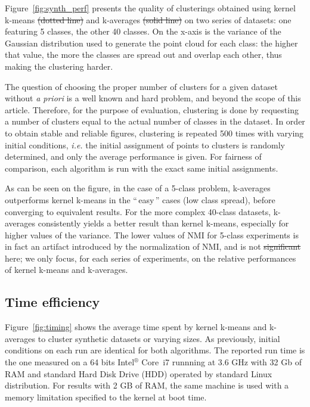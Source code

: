 \documentclass[natbib,smallextended]{svjour3}
\newcommand{\gl}[1]{``\,#1\,''} %
\providecommand{\DIFaddtex}[1]{{\protect\color{blue}\uwave{#1}}} %
\providecommand{\DIFdeltex}[1]{{\protect\color{red}\sout{#1}}}                      %
\providecommand{\DIFaddbegin}{} %
\providecommand{\DIFaddend}{} %
\providecommand{\DIFdelbegin}{} %
\providecommand{\DIFdelend}{} %
\providecommand{\DIFadd}[1]{\texorpdfstring{\DIFaddtex{#1}}{#1}} %
\providecommand{\DIFdel}[1]{\texorpdfstring{\DIFdeltex{#1}}{}} %
\begin{document}
Figure~\ref{fig:synth_perf} presents the quality of clusterings obtained using kernel k-means \DIFdelbegin \DIFdel{(dotted line) }\DIFdelend and k-averages \DIFdelbegin \DIFdel{(solid line) }\DIFdelend on two series of datasets: one featuring 5 classes, the other 40 classes. On the x-axis is the variance of the Gaussian distribution used to generate the point cloud for each class: the higher that value, the more the classes are spread out and overlap each other, thus making the clustering harder.

The question of choosing the proper number of clusters for a given dataset without \textit{a priori} is a well known and hard problem, and beyond the scope of this article. Therefore, for the purpose of evaluation, clustering is done by requesting a number of clusters equal to the actual number of classes in the dataset. In order to obtain stable and reliable figures, clustering is repeated 500 times with varying initial conditions, \textit{i.e.} the initial assignment of points to clusters is randomly determined, and only the average performance is given. For fairness of comparison, each algorithm is run with the exact same initial assignments.

As can be seen on the figure, in the case of a 5-class problem, k-averages outperforms kernel k-means in the \gl{easy} cases (low class spread), before converging to equivalent results. For the more complex 40-class datasets, k-averages consistently yields a better result than kernel k-means, especially for higher values of the variance. The lower values of NMI for 5-class experiments is in fact an artifact introduced by the normalization of NMI, and is not \DIFdelbegin \DIFdel{significant }\DIFdelend \DIFaddbegin \DIFadd{important }\DIFaddend here; we only focus, for each series of experiments, on the relative performances of kernel k-means and k-averages.

\subsection{Time efficiency}

Figure~\ref{fig:timing} shows the average time spent by kernel k-means and k-averages to cluster synthetic datasets or varying sizes. As previously, initial conditions on each run are identical for both algorithms. The reported run time is the one measured on a 64 bits Intel$^\circledR$ Core\texttrademark   \, i7 runnning at 3.6 GHz with 32 Gb of RAM and standard Hard Disk Drive (HDD)  operated by standard Linux distribution. For results with 2 GB of RAM, the same machine is used with a memory limitation specified to the kernel at boot time.
\end{document}
